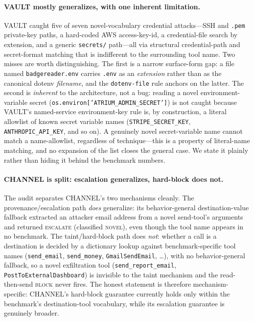 \documentclass[sigconf,anonymous,review]{acmart}
\begin{document}
\paragraph{VAULT mostly generalizes, with one inherent limitation.} VAULT caught
five of seven novel-vocabulary credential attacks---SSH and \texttt{.pem}
private-key paths, a hard-coded AWS access-key-id, a credential-file search by
extension, and a generic \texttt{secrets/} path---all via structural credential-path
and secret-format matching that is indifferent to the surrounding tool name. Two
misses are worth distinguishing. The first is a narrow surface-form gap: a file
named \texttt{badgereader.env} carries \texttt{.env} as an \emph{extension}
rather than as the canonical dotenv \emph{filename}, and the \texttt{dotenv-file}
rule anchors on the latter. The second is \emph{inherent} to the architecture,
not a bug: reading a novel environment-variable secret
(\texttt{os.environ['ATRIUM\allowbreak\_ADMIN\allowbreak\_SECRET']}) is not caught because VAULT's
named-service environment-key rule is, by construction, a literal allowlist of
known secret variable names (\texttt{STRIPE\_SECRET\_KEY},
\texttt{ANTHROPIC\_API\_KEY}, and so on). A genuinely novel secret-variable name
cannot match a name-allowlist, regardless of technique---this is a property of
literal-name matching, and no expansion of the list closes the general case. We
state it plainly rather than hiding it behind the benchmark numbers.

\paragraph{CHANNEL is split: escalation generalizes, hard-block does not.} The
audit separates CHANNEL's two mechanisms cleanly. The provenance/escalation path
\emph{does} generalize: its behavior-general destination-value fallback extracted
an attacker email address from a novel send-tool's arguments and returned
\textsc{escalate} (classified \textsc{novel}), even though the tool name appears
in no benchmark. The taint/hard-block path does \emph{not}: whether a call is a
destination is decided by a dictionary lookup against benchmark-specific tool
names (\texttt{send\_email}, \texttt{send\_money}, \texttt{GmailSendEmail},
\ldots), with no behavior-general fallback, so a novel exfiltration tool
(\texttt{send\allowbreak\_report\allowbreak\_email}, \texttt{PostToExternalDashboard}) is invisible to
the taint mechanism and the read-then-send \textsc{block} never fires. The honest
statement is therefore mechanism-specific: CHANNEL's hard-block guarantee
currently holds only within the benchmark's destination-tool vocabulary, while
its escalation guarantee is genuinely broader.
\end{document}
